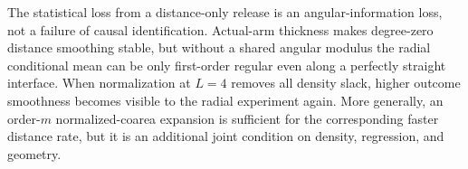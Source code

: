 The statistical loss from a distance-only release is an angular-information loss, not a failure of causal identification.  Actual-arm thickness makes degree-zero distance smoothing stable, but without a shared angular modulus the radial conditional mean can be only first-order regular even along a perfectly straight interface.  When normalization at \(L=4\) removes all density slack, higher outcome smoothness becomes visible to the radial experiment again.  More generally, an order-\(m\) normalized-coarea expansion is sufficient for the corresponding faster distance rate, but it is an additional joint condition on density, regression, and geometry.